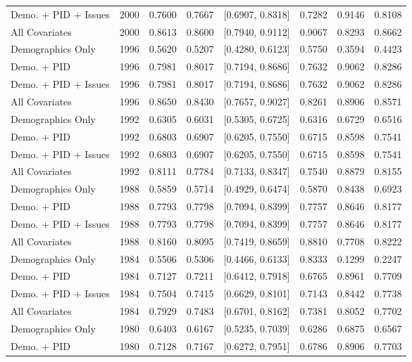 \begin{longtable}{lrrrlrrr}
  Demo. + PID + Issues & 2000 & 0.7600 & 0.7667 & [0.6907, 0.8318] & 0.7282 & 0.9146 & 0.8108 \\ 
  All Covariates & 2000 & 0.8613 & 0.8600 & [0.7940, 0.9112] & 0.9067 & 0.8293 & 0.8662 \\ 
  Demographics Only & 1996 & 0.5620 & 0.5207 & [0.4280, 0.6123] & 0.5750 & 0.3594 & 0.4423 \\ 
  Demo. + PID & 1996 & 0.7981 & 0.8017 & [0.7194, 0.8686] & 0.7632 & 0.9062 & 0.8286 \\ 
  Demo. + PID + Issues & 1996 & 0.7981 & 0.8017 & [0.7194, 0.8686] & 0.7632 & 0.9062 & 0.8286 \\ 
  All Covariates & 1996 & 0.8650 & 0.8430 & [0.7657, 0.9027] & 0.8261 & 0.8906 & 0.8571 \\ 
  Demographics Only & 1992 & 0.6305 & 0.6031 & [0.5305, 0.6725] & 0.6316 & 0.6729 & 0.6516 \\ 
  Demo. + PID & 1992 & 0.6803 & 0.6907 & [0.6205, 0.7550] & 0.6715 & 0.8598 & 0.7541 \\ 
  Demo. + PID + Issues & 1992 & 0.6803 & 0.6907 & [0.6205, 0.7550] & 0.6715 & 0.8598 & 0.7541 \\ 
  All Covariates & 1992 & 0.8111 & 0.7784 & [0.7133, 0.8347] & 0.7540 & 0.8879 & 0.8155 \\ 
  Demographics Only & 1988 & 0.5859 & 0.5714 & [0.4929, 0.6474] & 0.5870 & 0.8438 & 0.6923 \\ 
  Demo. + PID & 1988 & 0.7793 & 0.7798 & [0.7094, 0.8399] & 0.7757 & 0.8646 & 0.8177 \\ 
  Demo. + PID + Issues & 1988 & 0.7793 & 0.7798 & [0.7094, 0.8399] & 0.7757 & 0.8646 & 0.8177 \\ 
  All Covariates & 1988 & 0.8160 & 0.8095 & [0.7419, 0.8659] & 0.8810 & 0.7708 & 0.8222 \\ 
  Demographics Only & 1984 & 0.5506 & 0.5306 & [0.4466, 0.6133] & 0.8333 & 0.1299 & 0.2247 \\ 
  Demo. + PID & 1984 & 0.7127 & 0.7211 & [0.6412, 0.7918] & 0.6765 & 0.8961 & 0.7709 \\ 
  Demo. + PID + Issues & 1984 & 0.7504 & 0.7415 & [0.6629, 0.8101] & 0.7143 & 0.8442 & 0.7738 \\ 
  All Covariates & 1984 & 0.7929 & 0.7483 & [0.6701, 0.8162] & 0.7381 & 0.8052 & 0.7702 \\ 
  Demographics Only & 1980 & 0.6403 & 0.6167 & [0.5235, 0.7039] & 0.6286 & 0.6875 & 0.6567 \\ 
  Demo. + PID & 1980 & 0.7128 & 0.7167 & [0.6272, 0.7951] & 0.6786 & 0.8906 & 0.7703 \\ 

\end{longtable}

